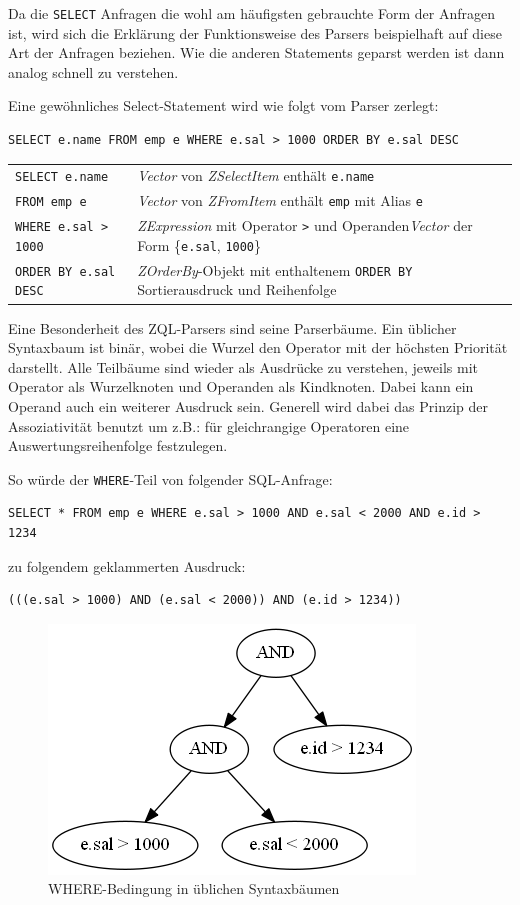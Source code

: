 Da die \verb|SELECT| Anfragen die wohl am häufigsten gebrauchte Form der Anfragen ist, wird sich die Erklärung der Funktionsweise des Parsers beispielhaft auf diese Art der Anfragen beziehen. Wie die anderen Statements geparst werden ist dann analog schnell zu verstehen.

Eine gewöhnliches Select-Statement wird wie folgt vom Parser zerlegt:
\begin{verbatim}SELECT e.name FROM emp e WHERE e.sal > 1000 ORDER BY e.sal DESC\end{verbatim}

\begin{tabular}{ll}
\verb|SELECT e.name| & \textit{Vector} von \textit{ZSelectItem} enthält \verb|e.name| \\ 
\verb|FROM emp e| & \textit{Vector} von \textit{ZFromItem} enthält \verb|emp| mit Alias \verb|e| \\
\verb|WHERE e.sal > 1000| & \textit{ZExpression} mit Operator \verb|>| und Operanden\textit{Vector} der Form \{\verb|e.sal|, \verb|1000|\} \\
\verb|ORDER BY e.sal DESC| & \textit{ZOrderBy}-Objekt mit enthaltenem \verb|ORDER BY| Sortierausdruck und Reihenfolge
\end{tabular}

Eine Besonderheit des ZQL-Parsers sind seine Parserbäume. Ein üblicher Syntaxbaum ist binär, wobei die Wurzel den Operator mit der höchsten Priorität darstellt. Alle Teilbäume sind wieder als Ausdrücke zu verstehen, jeweils mit Operator als Wurzelknoten und Operanden als Kindknoten. Dabei kann ein Operand auch ein weiterer Ausdruck sein. Generell wird dabei das Prinzip der Assoziativität benutzt um z.B.: für gleichrangige Operatoren eine Auswertungsreihenfolge festzulegen.

So würde der \verb|WHERE|-Teil von folgender SQL-Anfrage:
\begin{verbatim}
SELECT * FROM emp e WHERE e.sal > 1000 AND e.sal < 2000 AND e.id > 1234
\end{verbatim}

zu folgendem geklammerten Ausdruck:
\begin{verbatim}
(((e.sal > 1000) AND (e.sal < 2000)) AND (e.id > 1234))
\end{verbatim}

\begin{figure}
\label{baum1}
\includegraphics[scale=0.7]{Bilder/where_syntax.png}
\caption{WHERE-Bedingung in üblichen Syntaxbäumen}
\end{figure}

